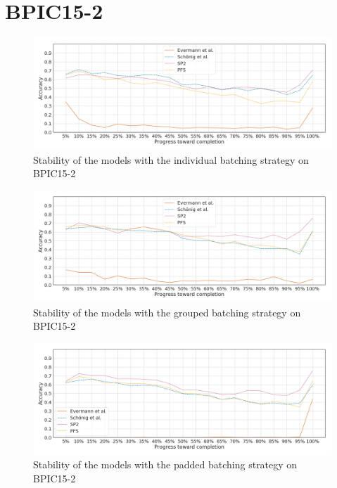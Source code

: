 \section*{BPIC15-2}
\begin{figure}[!htb]
    \centering
    \includegraphics[width=\textwidth]{gfx/bpic2015_2/individual_stability.png}
    \caption{Stability of the models with the individual batching strategy on BPIC15-2}
    \label{fig:bpic15-2-windowed-stability}
\end{figure}
\begin{figure}[!htb]
    \centering
    \includegraphics[width=\textwidth]{gfx/bpic2015_2/grouped_stability.png}
    \caption{Stability of the models with the grouped batching strategy on BPIC15-2}
    \label{fig:bpic15-2-windowed-stability}
\end{figure}
\begin{figure}[!htb]
    \centering
    \includegraphics[width=\textwidth]{gfx/bpic2015_2/padded_stability.png}
    \caption{Stability of the models with the padded batching strategy on BPIC15-2}
    \label{fig:bpic15-2-windowed-stability}
\end{figure}
